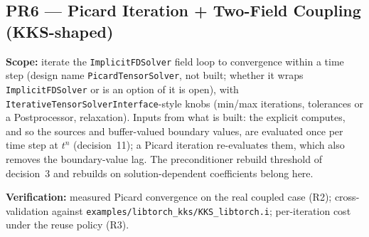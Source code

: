 \documentclass[11pt]{article}
\newcommand{\pr}[2]{\subsection{PR#1 --- #2}}
\begin{document}
\pr{6}{Picard Iteration + Two-Field Coupling (KKS-shaped)}
\textbf{Scope:} iterate the \texttt{ImplicitFDSolver} field loop to
convergence within a time step (design name \texttt{PicardTensorSolver},
not built; whether it wraps \texttt{ImplicitFDSolver} or is an option of it
is open), with \texttt{IterativeTensorSolverInterface}-style knobs (min/max
iterations, tolerances or a Postprocessor, relaxation). Inputs from what is
built: the explicit computes, and so the sources and buffer-valued boundary
values, are evaluated once per time step at $t^n$ (decision~11); a Picard
iteration re-evaluates them, which also removes the boundary-value lag. The
preconditioner rebuild threshold of decision~3 and rebuilds on
solution-dependent coefficients belong here.

\textbf{Verification:} measured Picard convergence on the real coupled case
(R2); cross-validation against \texttt{examples/libtorch\_kks/KKS\_libtorch.i};
per-iteration cost under the reuse policy (R3).
\end{document}
